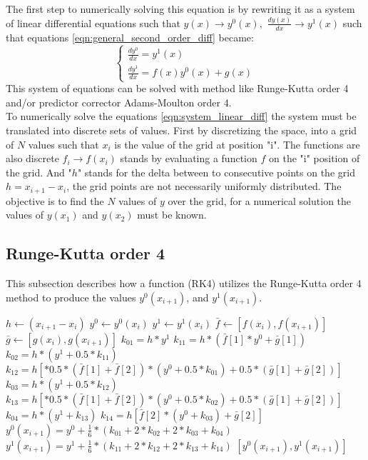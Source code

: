 \documentclass[11pt]{article}
\begin{document}
The first step to numerically solving this equation is by rewriting it as a system of linear differential 
equations such that $y(x) \rightarrow y^0(x),$ $\frac{dy(x)}{dx} \rightarrow y^1(x)$ such that equations 
\ref*{eqn:general_second_order_diff} became:
\begin{equation}
    \begin{cases}
        \label{eqn:system_linear_diff}
        \frac{dy^0}{dx} = y^1(x) \\
        \frac{dy^1}{dx} = f(x)y^0(x) + g(x)
    \end{cases}
\end{equation}
This system of equations can be solved with method like Runge-Kutta order 4 and/or predictor corrector
Adams-Moulton order 4.\\
To numerically solve the equations \ref*{eqn:system_linear_diff} the system must be translated into 
 discrete sets of values. First by discretizing the space, into a grid of $N$ values such that $x_i$ is the 
 value of the grid at position "i". The functions are also discrete $f_i \rightarrow f(x_i)$ stands by evaluating
 a function $f$ on the "i" position of the grid. And "$h$" stands for the delta between to consecutive points on the grid
 $h = x_{i+1} - x_{i}$, the grid points are not necessarily uniformly distributed. The objective is to find the $N$ values of
 $y$ over the grid, for a numerical solution the values of $y(x_1)$ and $y(x_2)$ must be known.
 \subsection*{Runge-Kutta order 4}
This subsection describes how a function (RK4) utilizes the Runge-Kutta order 4 method to produce the values $y^0(x_{i+1})$, and 
$y^1(x_{i+1})$.
%
 \begin{algorithmic}
    \State $h \gets (x_{i+1} - x_{i})$
    \State $ y^0 \gets y^0(x_{i})$
    \State $ y^1 \gets y^1(x_{i})$
    \State $\bar{f} \gets [f(x_i), f(x_{i+1})]$
    \State $\bar{g} \gets [g(x_i), g(x_{i+1})]$
    \State $k_{01} = h*y^1$
    \State $k_{11} = h*(\bar{f}[1]*y^0 + \bar{g}[1])$
    \State $k_{02} = h*(y^1 + 0.5*k_{11})$
    \State $k_{12} = h[*0.5*(\bar{f}[1] + \bar{f}[2])*(y^0 + 0.5*k_{01}) + 0.5*(\bar{g}[1] + \bar{g}[2])]$
    \State $k_{03} = h*(y^1 + 0.5*k_{12})$
    \State $k_{13} = h[*0.5*(\bar{f}[1] + \bar{f}[2])*(y^0 + 0.5*k_{02}) + 0.5*(\bar{g}[1] + \bar{g}[2])]$
    \State $k_{04} = h*(y^1 + k_{13})$
    \State $k_{14} = h[\bar{f}[2]*(y^0 + k_{03}) + \bar{g}[2]]$
    \State $y^0(x_{i+1}) = y^0 + \frac{1}{6}*(k_{01} + 2*k_{02} + 2*k_{03} + k_{04})$
    \State $y^1(x_{i+1}) = y^1 + \frac{1}{6}*(k_{11} + 2*k_{12} + 2*k_{13} + k_{14})$
    \State \Return $[y^0(x_{i+1}), y^1(x_{i+1})]$
\end{algorithmic}
\end{document}
